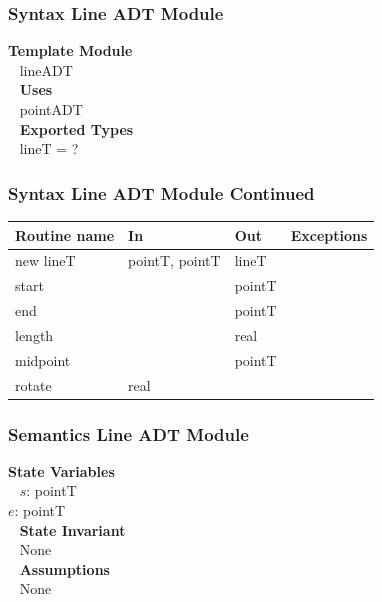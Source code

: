 \documentclass[t,12pt,numbers,fleqn]{beamer}
\begin{document}

\begin{frame}
\frametitle{Syntax Line ADT Module}

\textbf{Template Module}\\
~\newline
lineADT\\
~\newline
\textbf{Uses}\\
~\newline
pointADT\\
~\newline
\textbf{Exported Types}\\
~\newline
lineT = ?

\end{frame}


\begin{frame}
\frametitle{Syntax Line ADT Module Continued}

\begin{tabular}{| l | l | l | l |}
\hline
\textbf{Routine name} & \textbf{In} & \textbf{Out} & \textbf{Exceptions}\\
\hline
new lineT & pointT, pointT & lineT & ~\\
\hline
start & ~ & pointT & ~\\
\hline
end & ~ & pointT & ~\\
\hline 
length & ~ & real & ~\\
\hline
midpoint & ~ & pointT & ~\\
\hline
rotate & real & ~ & ~\\
\hline
\end{tabular}

\end{frame}


\begin{frame}
\frametitle{Semantics Line ADT Module}

\textbf{State Variables}\\
~\newline
$s$: pointT\\
$e$: pointT\\
~\newline
\textbf {State Invariant}\\
~\newline
None\\
~\newline
\textbf{Assumptions}\\
~\newline
None

\end{frame}
\end{document}
